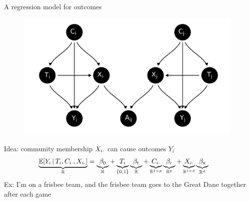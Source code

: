 \documentclass{beamer}
\theoremstyle{remark}
\begin{document}
\begin{frame}{A regression model for outcomes}

    \centering

    \begin{figure}
        \includegraphics[scale=0.35]{figures/dags/mediating-5.png}
        \label{fig:mediating-5-again}
    \end{figure}

    Idea: community membership $X_{i \cdot}$ can cause outcomes $Y_i$
    \begin{align*}
        \underbrace{\E[T_i, \C_{i \cdot}, \X_{i \cdot}]{Y_i}}_{\R}
         & = \underbrace{\betazero}_{\R}
        + \underbrace{T_i}_{\{0, 1\}} \underbrace{\betat}_{\R}
        + \underbrace{\C_{i \cdot}}_{\R^{1 \times p}} \underbrace{\betac}_{\R^{p}}
        + \underbrace{\X_{i \cdot}}_{\R^{1 \times d}} \underbrace{\betax}_{\R^d}
    \end{align*}
    Ex: I'm on a frisbee team, and the frisbee team goes to the Great Dane together after each game

\end{frame}
\end{document}
